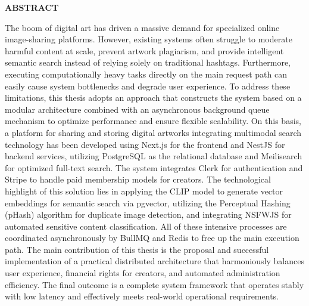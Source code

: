 \begin{center}
    \Large{\textbf{ABSTRACT}}\\
\end{center}
\vspace{1cm}

The boom of digital art has driven a massive demand for specialized online image-sharing platforms. However, existing systems often struggle to moderate harmful content at scale, prevent artwork plagiarism, and provide intelligent semantic search instead of relying solely on traditional hashtags. Furthermore, executing computationally heavy tasks directly on the main request path can easily cause system bottlenecks and degrade user experience. To address these limitations, this thesis adopts an approach that constructs the system based on a modular architecture combined with an asynchronous background queue mechanism to optimize performance and ensure flexible scalability. On this basis, a platform for sharing and storing digital artworks integrating multimodal search technology has been developed using Next.js for the frontend and NestJS for backend services, utilizing PostgreSQL as the relational database and Meilisearch for optimized full-text search. The system integrates Clerk for authentication and Stripe to handle paid membership models for creators. The technological highlight of this solution lies in applying the CLIP model to generate vector embeddings for semantic search via pgvector, utilizing the Perceptual Hashing (pHash) algorithm for duplicate image detection, and integrating NSFWJS for automated sensitive content classification. All of these intensive processes are coordinated asynchronously by BullMQ and Redis to free up the main execution path. The main contribution of this thesis is the proposal and successful implementation of a practical distributed architecture that harmoniously balances user experience, financial rights for creators, and automated administration efficiency. The final outcome is a complete system framework that operates stably with low latency and effectively meets real-world operational requirements.
